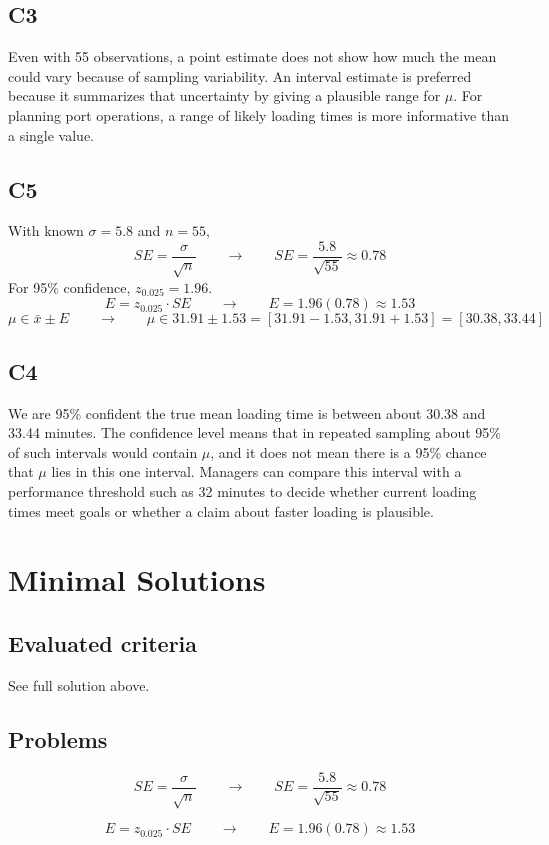\begin{ExamProblems}
		\subsection*{C3}
		Even with 55 observations, a point estimate does not show how much the mean could vary because of sampling variability. An interval estimate is preferred because it summarizes that uncertainty by giving a plausible range for $\mu$. For planning port operations, a range of likely loading times is more informative than a single value.

		\subsection*{C5}
		With known $\sigma = 5.8$ and $n=55$,
		\[
		SE = \frac{\sigma}{\sqrt{n}} \qquad \longrightarrow \qquad SE = \frac{5.8}{\sqrt{55}} \approx 0.78
		\]
		For 95\% confidence, $z_{0.025}=1.96$.
		\[
		E = z_{0.025} \cdot SE \qquad \longrightarrow \qquad E = 1.96(0.78) \approx 1.53
		\]
		\[
		\mu \in \bar{x} \pm E \qquad \longrightarrow \qquad \mu \in 31.91 \pm 1.53 = [31.91 - 1.53, 31.91 + 1.53] = [30.38, 33.44]
		\]

		\subsection*{C4}
		We are 95\% confident the true mean loading time is between about 30.38 and 33.44 minutes. The confidence level means that in repeated sampling about 95\% of such intervals would contain $\mu$, and it does not mean there is a 95\% chance that $\mu$ lies in this one interval. Managers can compare this interval with a performance threshold such as 32 minutes to decide whether current loading times meet goals or whether a claim about faster loading is plausible.
	\end{ExamProblems}


\section{Minimal Solutions}

\subsection*{Evaluated criteria}
See full solution above.

\subsection*{Problems}
\[SE = \frac{\sigma}{\sqrt{n}} \qquad \longrightarrow \qquad SE = \frac{5.8}{\sqrt{55}} \approx 0.78\]

\[E = z_{0.025} \cdot SE \qquad \longrightarrow \qquad E = 1.96(0.78) \approx 1.53\]


